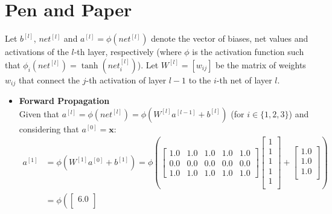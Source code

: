 \documentclass{exam}
\begin{document}
    \section{Pen and Paper}
    \begin{questions}
        \item Let $b^{[l]}$, $net^{[l]}$ and $a^{[l]} = \phi(net^{[l]})$ denote the vector of biases, net values and activations of the $l$-th layer, respectively (where $\phi$ is the activation function such that $\phi_i(net^{[l]}) = \tanh(net_i^{[l]})$). Let $W^{[l]} = [w_{ij}]$ be the matrix of weights $w_{ij}$ that connect the $j$-th activation of layer $l-1$ to the $i$-th net of layer $l$.
        \begin{itemize}
            \item \textbf{Forward Propagation}
            \vspace{0.4em} \\
            Given that $a^{[l]} = \phi(net^{[l]}) = \phi(W^{[l]}a^{[l-1]} + b^{[l]})$ (for $i \in \{1, 2, 3\}$) and considering that $a^{[0]} = \mathbf{x}$:
            \begin{align*}
                a^{[1]} &= \phi(W^{[1]}a^{[0]} + b^{[1]}) = \phi\left(
                \begin{bmatrix}
                    1.0 & 1.0 & 1.0 & 1.0 & 1.0  \\
                    0.0 & 0.0 & 0.0 & 0.0 & 0.0  \\
                    1.0 & 1.0 & 1.0 & 1.0 & 1.0 
                \end{bmatrix} 
                \begin{bmatrix}
                    1  \\
                    1  \\
                    1  \\
                    1  \\
                    1  \\
                \end{bmatrix} + 
                \begin{bmatrix}
                    1.0  \\
                    1.0  \\
                    1.0  \\
                \end{bmatrix} \right) \\
                &= \phi\left(
                \begin{bmatrix}
                    6.0  \\

\end{bmatrix}
\end{align*}
\end{itemize}
\end{questions}
\end{document}
